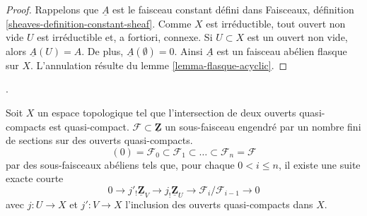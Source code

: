 \begin{proof}

Rappelons que $\underline{A}$ est le faisceau constant défini dans Faisceaux, définition \ref{sheaves-definition-constant-sheaf}. Comme $X$ est irréductible, tout ouvert non vide $U$ est irréductible et, a fortiori, connexe. Si $U \subset X$
est un ouvert non vide, alors $\underline{A}(U) = A$. De plus, $\underline{A}(\emptyset) = 0$. Ainsi $\underline{A}$
est un faisceau abélien flasque sur $X$. L'annulation résulte du lemme \ref{lemma-flasque-acyclic}.

\end{proof}

\begin{lemma}

\label{lemma-subsheaf-of-constant-sheaf}

\begin{reference}

\cite[Page 168]{Tohoku}.

\end{reference}

Soit $X$ un espace topologique tel que l'intersection de deux ouverts quasi-compacts est quasi-compact.
$\mathcal{F} \subset \underline{\mathbf{Z}}$
un sous-faisceau engendré par un nombre fini de sections sur des ouverts quasi-compacts.
$$
(0) = \mathcal{F}_0 \subset \mathcal{F}_1 \subset \ldots \subset
\mathcal{F}_n = \mathcal{F}
$$
par des sous-faisceaux abéliens tels que, pour chaque $0 < i \leq n$,
il existe une suite exacte courte
$$
0 \to j'_!\underline{\mathbf{Z}}_V \to j_!\underline{\mathbf{Z}}_U \to
\mathcal{F}_i/\mathcal{F}_{i - 1} \to 0
$$
avec $j : U \to X$ et $j' : V \to X$ l'inclusion des ouverts quasi-compacts dans $X$.

\end{lemma}

